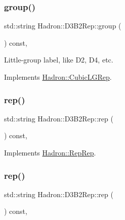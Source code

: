\subsubsection{\texorpdfstring{group()}{group()}\hspace{0.1cm}{\footnotesize\ttfamily [3/3]}}
{\footnotesize\ttfamily std\+::string Hadron\+::\+D3\+B2\+Rep\+::group (\begin{DoxyParamCaption}{ }\end{DoxyParamCaption}) const\hspace{0.3cm}{\ttfamily [inline]}, {\ttfamily [virtual]}}

Little-\/group label, like D2, D4, etc. 

Implements \mbox{\hyperlink{structHadron_1_1CubicLGRep_a9bdb14b519a611d21379ed96a3a9eb41}{Hadron\+::\+Cubic\+L\+G\+Rep}}.

\mbox{\label{structHadron_1_1D3B2Rep_abcd797a15df29cb4a68037442daaf3d5}} 
\subsubsection{\texorpdfstring{rep()}{rep()}\hspace{0.1cm}{\footnotesize\ttfamily [1/3]}}
{\footnotesize\ttfamily std\+::string Hadron\+::\+D3\+B2\+Rep\+::rep (\begin{DoxyParamCaption}{ }\end{DoxyParamCaption}) const\hspace{0.3cm}{\ttfamily [inline]}, {\ttfamily [virtual]}}



Implements \mbox{\hyperlink{structHadron_1_1RepRep_ab3213025f6de249f7095892109575fde}{Hadron\+::\+Rep\+Rep}}.

\mbox{\label{structHadron_1_1D3B2Rep_abcd797a15df29cb4a68037442daaf3d5}} 
\subsubsection{\texorpdfstring{rep()}{rep()}\hspace{0.1cm}{\footnotesize\ttfamily [2/3]}}
{\footnotesize\ttfamily std\+::string Hadron\+::\+D3\+B2\+Rep\+::rep (\begin{DoxyParamCaption}{ }\end{DoxyParamCaption}) const\hspace{0.3cm}{\ttfamily [inline]}, {\ttfamily [virtual]}}



